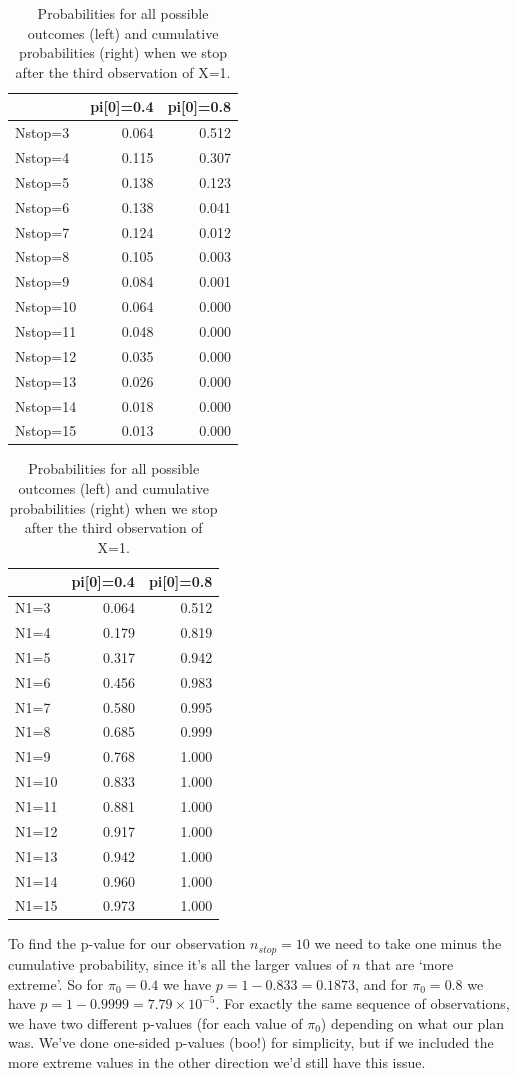 \documentclass[
  openany]{book}
\theoremstyle{definition}
\theoremstyle{definition}
\theoremstyle{definition}
\theoremstyle{definition}
\theoremstyle{remark}
\begin{document}
\begin{table}
\caption{\label{tab:bin2}Probabilities for all possible outcomes (left) and cumulative probabilities (right) when we stop after the third observation of X=1.}

\centering
\begin{tabular}[t]{lrr}
\toprule
  & pi[0]=0.4 & pi[0]=0.8\\
\midrule
Nstop=3 & 0.064 & 0.512\\
Nstop=4 & 0.115 & 0.307\\
Nstop=5 & 0.138 & 0.123\\
Nstop=6 & 0.138 & 0.041\\
Nstop=7 & 0.124 & 0.012\\
\addlinespace
Nstop=8 & 0.105 & 0.003\\
Nstop=9 & 0.084 & 0.001\\
Nstop=10 & 0.064 & 0.000\\
Nstop=11 & 0.048 & 0.000\\
Nstop=12 & 0.035 & 0.000\\
\addlinespace
Nstop=13 & 0.026 & 0.000\\
Nstop=14 & 0.018 & 0.000\\
Nstop=15 & 0.013 & 0.000\\
\bottomrule
\end{tabular}
\centering
\begin{tabular}[t]{lrr}
\toprule
  & pi[0]=0.4 & pi[0]=0.8\\
\midrule
N1=3 & 0.064 & 0.512\\
N1=4 & 0.179 & 0.819\\
N1=5 & 0.317 & 0.942\\
N1=6 & 0.456 & 0.983\\
N1=7 & 0.580 & 0.995\\
\addlinespace
N1=8 & 0.685 & 0.999\\
N1=9 & 0.768 & 1.000\\
N1=10 & 0.833 & 1.000\\
N1=11 & 0.881 & 1.000\\
N1=12 & 0.917 & 1.000\\
\addlinespace
N1=13 & 0.942 & 1.000\\
N1=14 & 0.960 & 1.000\\
N1=15 & 0.973 & 1.000\\
\bottomrule
\end{tabular}
\end{table}

To find the p-value for our observation \(n_{stop}=10\) we need to take one minus the cumulative probability, since it's all the larger values of \(n\) that are `more extreme'. So for \(\pi_0=0.4\) we have \(p=1-0.833 = 0.1873\), and for \(\pi_0=0.8\) we have \(p=1-0.9999 = 7.79\times{10^{-5}}\). For exactly the same sequence of observations, we have two different p-values (for each value of \(\pi_0\)) depending on what our plan was. We've done one-sided p-values (boo!) for simplicity, but if we included the more extreme values in the other direction we'd still have this issue.
\end{document}
